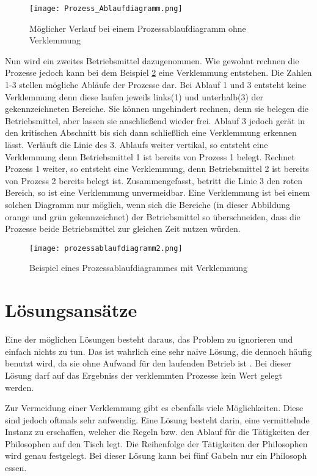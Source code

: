 \begin{figure}[H]
\caption{Möglicher Verlauf bei einem Prozessablaufdiagramm ohne Verklemmung}
\label{fig:normales_Ablaufdiagramm}
\centering
\texttt{[image: Prozess\_Ablaufdiagramm.png]}
\end{figure}

Nun wird ein zweites Betriebsmittel dazugenommen. Wie gewohnt rechnen die Prozesse jedoch kann bei dem Beispiel \ref{fig:verklemmtes_ablaufdiagramm} eine Verklemmung entstehen. Die Zahlen 1-3 stellen mögliche Abläufe der Prozesse dar. Bei Ablauf 1 und 3 entsteht keine Verklemmung denn diese laufen jeweils links(1) und unterhalb(3) der gekennzeichneten Bereiche. Sie können ungehindert rechnen, denn sie belegen die Betriebsmittel, aber lassen sie anschließend wieder frei. Ablauf 3 jedoch gerät in den kritischen Abschnitt bis sich dann schließlich eine Verklemmung erkennen lässt. Verläuft die Linie des 3. Ablaufs weiter vertikal, so entsteht eine Verklemmung denn Betriebsmittel 1 ist bereits von Prozess 1 belegt. Rechnet Prozess 1 weiter, so entsteht eine Verklemmung, denn Betriebsmittel 2 ist bereits von Prozess 2 bereits belegt ist. Zusammengefasst, betritt die Linie 3 den roten Bereich, so ist eine Verklemmung unvermeidbar.
Eine Verklemmung ist bei einem solchen Diagramm nur möglich, wenn sich die Bereiche (in dieser Abbildung orange und grün gekennzeichnet) der Betriebsmittel so überschneiden, dass die Prozesse beide Betriebsmittel zur gleichen Zeit nutzen würden.

\begin{figure}[H]
\caption{Beispiel eines Prozessablaufdiagrammes mit Verklemmung}
\label{fig:verklemmtes_ablaufdiagramm}
\centering
\texttt{[image: prozessablaufdiagramm2.png]}
\end{figure}

\section{Lösungsansätze}
\label{lösung}

Eine der möglichen Lösungen besteht daraus, das Problem zu ignorieren und einfach nichts zu tun. Das ist wahrlich eine sehr naive Lösung, die dennoch häufig benutzt wird, da sie ohne Aufwand für den laufenden Betrieb ist \parencite[vgl. ][S.79]{mandl2020} . Bei dieser Lösung darf auf das Ergebniss der verklemmten Prozesse kein Wert gelegt werden.
 
Zur Vermeidung einer Verklemmung gibt es ebenfalls viele Möglichkeiten. Diese sind jedoch oftmals sehr  aufwendig. Eine Lösung besteht darin, eine vermittelnde Instanz zu erschaffen, welcher die Regeln bzw. den Ablauf für die Tätigkeiten der Philosophen auf den Tisch legt. Die Reihenfolge der Tätigkeiten der Philosophen wird genau festgelegt. Bei dieser Lösung kann bei fünf Gabeln nur ein Philosoph essen.\parencite[vgl.][S.220]{tanenbaum2016}

